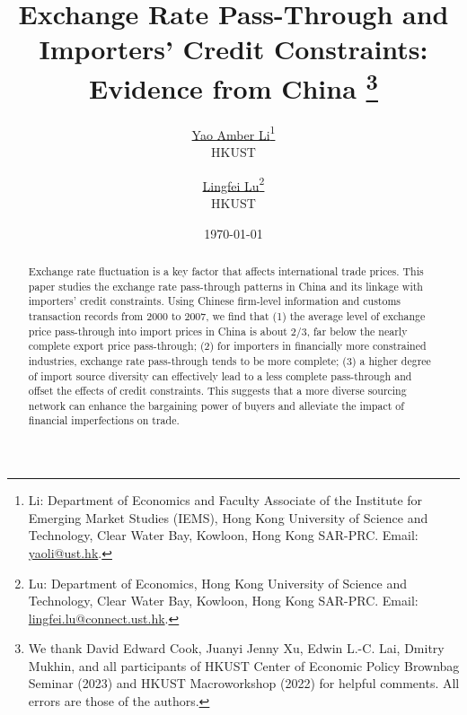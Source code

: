 

\linespread{1.2}
\geometry{a4paper,scale=0.75}
\setlength{\parskip}{0.5em}



\title{  \Large \textbf{Exchange Rate Pass-Through and Importers' Credit Constraints: Evidence from China} 
\thanks{We thank David Edward Cook, Juanyi Jenny Xu, Edwin L.-C. Lai, Dmitry Mukhin, and all participants of HKUST Center of Economic Policy Brownbag Seminar (2023) and HKUST Macroworkshop (2022) for helpful comments. All errors are those of the authors.}}

\author{\large \href{http://yaoli.people.ust.hk/}{Yao Amber Li}\thanks{Li: Department of Economics and Faculty Associate of the Institute for Emerging Market Studies (IEMS), Hong Kong University of Science and Technology, Clear Water Bay, Kowloon, Hong Kong SAR-PRC. Email: \href{mailto:yaoli@ust.hk}{yaoli@ust.hk}.}\\ \large{HKUST}
\and \large \href{}{Lingfei Lu}\thanks{Lu: Department of Economics, Hong Kong University of Science and Technology, Clear Water Bay, Kowloon, Hong Kong SAR-PRC. Email: \href{mailto:}{lingfei.lu@connect.ust.hk}.} \\ \large{HKUST}
 }

\date{\today }

\maketitle

\begin{abstract}
Exchange rate fluctuation is a key factor that affects international trade prices. This paper studies the exchange rate pass-through patterns in China and its linkage with importers' credit constraints. Using Chinese firm-level information and customs transaction records from 2000 to 2007, we find that (1) the average level of exchange price pass-through into import prices in China is about 2/3, far below the nearly complete export price pass-through; (2) for importers in financially more constrained industries, exchange rate pass-through tends to be more complete; (3) a higher degree of import source diversity can effectively lead to a less complete pass-through and offset the effects of credit constraints. This suggests that a more diverse sourcing network can enhance the bargaining power of buyers and alleviate the impact of financial imperfections on trade.

\end{abstract}

